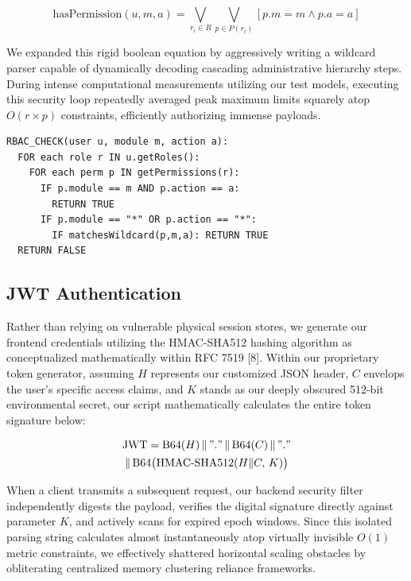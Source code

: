 \begin{equation}
\text{hasPermission}(u, m, a) = \bigvee_{r_i \in R} \bigvee_{p \in P(r_i)} \left[p.m = m \wedge p.a = a\right]
\end{equation}

We expanded this rigid boolean equation by aggressively writing a
wildcard parser capable of dynamically decoding cascading administrative
hierarchy steps. During intense computational measurements utilizing our
test models, executing this security loop repeatedly averaged peak
maximum limits squarely atop \(O(r \times p)\) constraints, efficiently
authorizing immense payloads.

\begin{footnotesize}
\begin{verbatim}
RBAC_CHECK(user u, module m, action a):
  FOR each role r IN u.getRoles():
    FOR each perm p IN getPermissions(r):
      IF p.module == m AND p.action == a:
        RETURN TRUE
      IF p.module == "*" OR p.action == "*":
        IF matchesWildcard(p,m,a): RETURN TRUE
  RETURN FALSE
\end{verbatim}
\end{footnotesize}

\subsection{JWT Authentication}\label{jwt-authentication}

Rather than relying on vulnerable physical session stores, we generate
our frontend credentials utilizing the HMAC-SHA512 hashing algorithm as
conceptualized mathematically within RFC 7519 {[}8{]}. Within our
proprietary token generator, assuming \(H\) represents our customized
JSON header, \(C\) envelops the user's specific access claims, and \(K\)
stands as our deeply obscured 512-bit environmental secret, our script
mathematically calculates the entire token signature below:

\begin{multline}
\text{JWT} = \text{B64}(H) \,\|\, "." \,\|\, \text{B64}(C) \,\|\, "." \\
  \|\, \text{B64}\bigl(\text{HMAC-SHA512}(H\|C,\, K)\bigr)
\end{multline}

When a client transmits a subsequent request, our backend security
filter independently digests the payload, verifies the digital signature
directly against parameter \(K\), and actively scans for expired epoch
windows. Since this isolated parsing string calculates almost
instantaneously atop virtually invisible \(O(1)\) metric constraints, we
effectively shattered horizontal scaling obstacles by obliterating
centralized memory clustering reliance frameworks.

